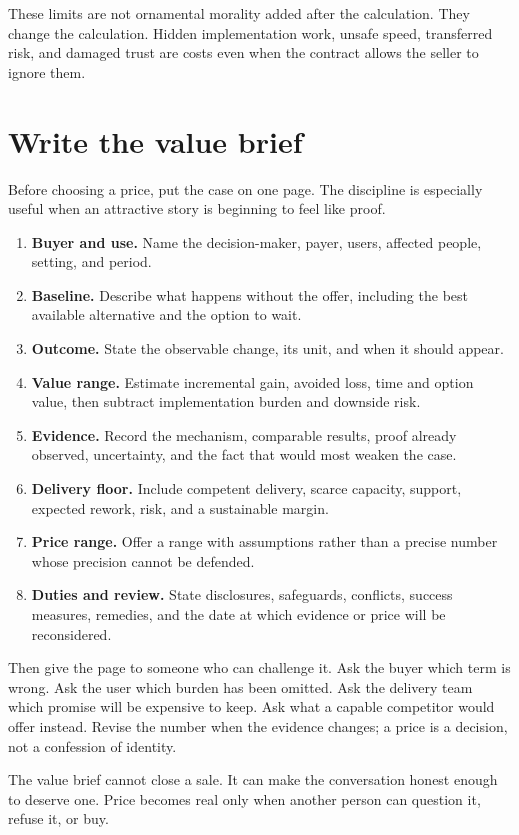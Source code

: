 These limits are not ornamental morality added after the calculation. They
change the calculation. Hidden implementation work, unsafe speed, transferred
risk, and damaged trust are costs even when the contract allows the seller to
ignore them.

\section{Write the value brief}

Before choosing a price, put the case on one page. The discipline is especially
useful when an attractive story is beginning to feel like proof.

\begin{enumerate}[itemsep=0.12em]
\item \textbf{Buyer and use.} Name the decision-maker, payer, users, affected
  people, setting, and period.
\item \textbf{Baseline.} Describe what happens without the offer, including the
  best available alternative and the option to wait.
\item \textbf{Outcome.} State the observable change, its unit, and when it should
  appear.
\item \textbf{Value range.} Estimate incremental gain, avoided loss, time and
  option value, then subtract implementation burden and downside risk.
\item \textbf{Evidence.} Record the mechanism, comparable results, proof already
  observed, uncertainty, and the fact that would most weaken the case.
\item \textbf{Delivery floor.} Include competent delivery, scarce capacity,
  support, expected rework, risk, and a sustainable margin.
\item \textbf{Price range.} Offer a range with assumptions rather than a precise
  number whose precision cannot be defended.
\item \textbf{Duties and review.} State disclosures, safeguards, conflicts,
  success measures, remedies, and the date at which evidence or price will be
  reconsidered.
\end{enumerate}

Then give the page to someone who can challenge it. Ask the buyer which term is
wrong. Ask the user which burden has been omitted. Ask the delivery team which
promise will be expensive to keep. Ask what a capable competitor would offer
instead. Revise the number when the evidence changes; a price is a decision,
not a confession of identity.

The value brief cannot close a sale. It can make the conversation honest enough
to deserve one. Price becomes real only when another person can question it,
refuse it, or buy.
